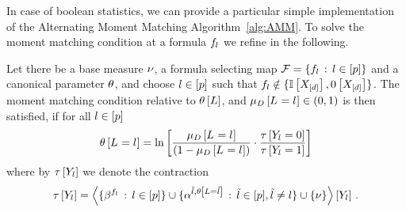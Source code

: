 In case of boolean statistics, we can provide a particular simple implementation of the Alternating Moment Matching Algorithm~\ref{alg:AMM}.
To solve the moment matching condition at a formula $f_{l}$ we refine  in the following.

\begin{lemma}
    \label{ref:lemMMinMLN}
    Let there be a base measure $\nu$, a formula selecting map $\mathcal{F}=\{f_{l} \, : \, l\in[p]\}$ and a canonical parameter $\theta$, and choose $l\in[p]$ such that $f_{l}  \notin \{\mathbb{I}\left[X_{[d]}\right],0\left[X_{[d]}\right]\}$.
    The moment matching condition relative to $\theta\left[L\right]$, and $\mu_{D}\left[L_{}=l_{}\right]\in(0,1)$ is then satisfied, if for all $l\in[p]$
    \begin{align}
        \label{sol:momentMatchingExformula}
        \theta\left[L_{}=l_{}\right] = \ln \left[ 
            \frac{\mu_{D}\left[L_{}=l_{}\right]}{(1-\mu_{D}\left[L_{}=l_{}\right])}
            \cdot \frac{\tau\left[Y_{l}=0\right]}{\tau\left[Y_{l}=1\right]}
         \right]
    \end{align}
    where by $\tau\left[Y_{l}\right]$ we denote the contraction
    \begin{align*}
        \tau\left[Y_{l}\right]
        = \left\langle \{\beta^{f_{l}} \,:\, l\in[p]\}
        \cup\{\alpha^{\tilde{l},\theta\left[L=\tilde{l}\right]} \,:\, \tilde{l} \in [p], \tilde{l}\neq l\}
        \cup\{\nu\}\right\rangle \left[ Y_{l} \right] \, .
    \end{align*}
\end{lemma}
